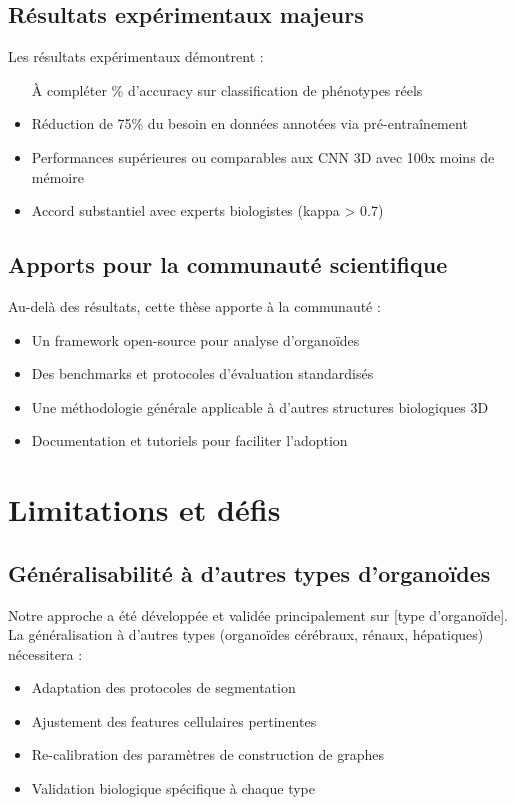 \subsection{Résultats expérimentaux majeurs}

Les résultats expérimentaux démontrent :
\begin{itemize}
    \item [À compléter]\% d'accuracy sur classification de phénotypes réels
    \item Réduction de 75\% du besoin en données annotées via pré-entraînement
    \item Performances supérieures ou comparables aux CNN 3D avec 100x moins de mémoire
    \item Accord substantiel avec experts biologistes (kappa > 0.7)
\end{itemize}

\subsection{Apports pour la communauté scientifique}

Au-delà des résultats, cette thèse apporte à la communauté :
\begin{itemize}
    \item Un framework open-source pour analyse d'organoïdes
    \item Des benchmarks et protocoles d'évaluation standardisés
    \item Une méthodologie générale applicable à d'autres structures biologiques 3D
    \item Documentation et tutoriels pour faciliter l'adoption
\end{itemize}

\section{Limitations et défis}

\subsection{Généralisabilité à d'autres types d'organoïdes}

Notre approche a été développée et validée principalement sur [type d'organoïde]. La généralisation à d'autres types (organoïdes cérébraux, rénaux, hépatiques) nécessitera :
\begin{itemize}
    \item Adaptation des protocoles de segmentation
    \item Ajustement des features cellulaires pertinentes
    \item Re-calibration des paramètres de construction de graphes
    \item Validation biologique spécifique à chaque type
\end{itemize}

